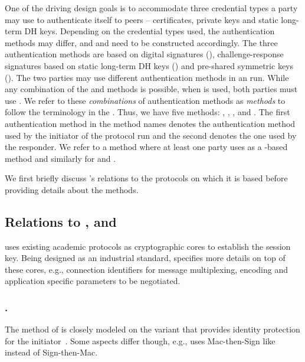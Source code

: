 One of the driving design goals is to accommodate three credential types
a party may use to authenticate itself to peers -- certificates, private keys
and static long-term DH keys.
%
Depending on the credential types used, the authentication methods may differ,
and \mAuthi{} and \mAuthr{} need to be constructed accordingly.
%
The three authentication methods are based on digital signatures (\mSig),
challenge-response signatures based on static long-term DH keys (\mStat) and
pre-shared symmetric keys (\mPsk).
%
The two parties may use different authentication methods in an \mEdhoc{} run.
%
While any combination of the \mSig{} and \mStat{} methods is possible,
when \mPsk{} is used, both parties must use \mPsk{}.
%
We refer to these \emph{combinations} of authentication methods as
\emph{methods} to follow the terminology in the \mSpec{}.
%
Thus, we have five methods: \mSigSig, \mSigStat, \mStatStat, \mStatSig{} and
\mPskPsk.
%
The first authentication method in the method names denotes the authentication
method used by the initiator of the protocol run and the second denotes the
one used by the responder.
%
We refer to a method where at least one party uses \mSig{} as a \mSig-based
method and similarly for \mStat{} and \mPsk.
%

We first briefly discuss \mEdhoc's relations to the protocols on which it is
based before providing details about the methods.
%

\spacehack
\subsection{Relations to \mSigma, \mOptls{} and \mNoise{}}
\label{sec:relationsToOtherProtocols}
\fillhack
\mEdhoc{} uses existing academic protocols as cryptographic cores to
establish the session key.
%
Being designed as an industrial standard, \mEdhoc{} specifies more details
on top of these cores, e.g., connection identifiers for message multiplexing,
encoding and application specific parameters to be negotiated.
%

\spacehack
\subsubsection{\mSigma{}.}
\label{sec:sigma}
The \mSigSig{} method of \mEdhoc{} is closely modeled on the \mSigma{}
variant that provides identity protection for the initiator~\cite{sigma}.
%
Some aspects differ though, e.g., \mSigSig{} uses Mac-then-Sign like
\mTls{} instead of Sign-then-Mac.
%

